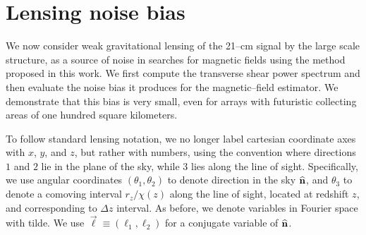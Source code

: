 \section{Lensing noise bias}

We now consider weak gravitational lensing of the 21--cm signal by the large scale structure, as a source of noise in searches for magnetic fields using the method proposed in this work. We first compute the transverse shear power spectrum and then evaluate the noise bias it produces for the magnetic--field estimator. We demonstrate that this bias is very small, even for arrays with futuristic collecting areas of one hundred square kilometers.

To follow standard lensing notation, we no longer label cartesian coordinate axes with $x$, $y$, and $z$, but rather with numbers, using the convention where directions $1$ and $2$ lie in the plane of the sky, while $3$ lies along the line of sight. Specifically, we use angular coordinates $(\theta_1, \theta_2)$ to denote direction in the sky ${\bf{\widehat n}}$, and $\theta_3$ to denote a comoving interval $r_z/\chi(z)$ along the line of sight, located at redshift $z$, and corresponding to $\Delta z$ interval. As before, we denote variables in Fourier space with tilde. We use $\vec{\ell}\equiv(\ell_1,\ell_2)$ for a conjugate variable of ${\bf{\widehat n}}$. 
 

